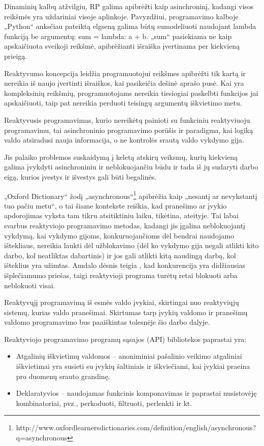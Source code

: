 Dinaminių kalbų atžvilgiu, RP galima apibrėžti kaip asinchroninį, kadangi visos reikšmės yra uždariniai visoje aplinkoje. Pavyzdžiui, programavimo kalboje „Python“ anksčiau pateiktą elgseną galima būtų sumodeliuoti naudojant lambda funkciją be argumentų: sum = lambda: a + b. „sum“ pasiekiama ne kaip apskaičiuota sveikoji reikšmė, apibrėžianti išraiška įvertinama per kiekvieną prieigą.

Reaktyvumo koncepcija leidžia programuotojui reikšmes apibrėžti tik kartą ir nereikia iš naujo įvertinti išraiškos, kai pasikeičia dešinė aprašo pusė. Kai yra kompleksinių reikšmių, programuotojams nereikia tiesiogiai paskelbti funkcijos jai apskaičiuoti, taip pat nereikia perduoti teisingų argumentų iškvietimo metu.

Reaktyvusis programavimas, kurio nereikėtų painioti su funkciniu reaktyviuoju programavimu, tai asinchroninio programavimo porūšis ir paradigma, kai logiką valdo atsiradusi nauja informacija, o ne kontrolės srautą valdo vykdymo gija.

Jis palaiko problemos suskaidymą į keletą atskirų veiksmų, kurių kiekvieną galima įvykdyti asinchroniniu ir neblokuojančiu būdu ir tada iš jų sudaryti darbo eigą, kurios įvestys ir išvestys gali būti begalinės.

„Oxford Dictionary“ žodį „asynchronous“\footnote{http://www.oxfordlearnersdictionaries.com/definition/english/asynchronous?q=asynchronous} apibrėžia kaip „nesantį ar nevykstantį tuo pačiu metu“, o tai šiame kontekste reiškia, kad pranešimo ar įvykio apdorojimas vyksta tam tikru atsitiktiniu laiku, tikėtina, ateityje. Tai labai svarbus reaktyviojo programavimo metodas, kadangi jis įgalina neblokuojantį vykdymą, kai vykdymo gijoms, konkuruojančioms dėl bendrai naudojamo ištekliaus, nereikia laukti dėl užblokavimo (dėl ko vykdymo gija negali atlikti kito darbo, kol neatliktas dabartinis) ir jos gali atlikti kitą naudingą darbą, kol išteklius yra užimtas. Amdalo dėsnis teigia \cite{Rodgers:1985:IMS:327070.327215}, kad konkurencija yra didžiausias išplečiamumo priešas, taigi reaktyvioji programa turėtų retai blokuoti arba neblokuoti visai.

Reaktyvųjį programavimą iš esmės valdo įvykiai, skirtingai nuo reaktyviųjų sistemų, kurias valdo pranešimai. Skirtumas tarp įvykių valdomo ir pranešimų valdomo programavimo bus paaiškintas tolesnėje šio darbo dalyje.

Reaktyviojo programavimo programų sąsajos (API) bibliotekos paprastai yra:

\begin{itemize}
  \item Atgalinių iškvietimų valdomos – anoniminiai pašalinio veikimo atgaliniai iškvietimai yra susieti su įvykių šaltiniais ir iškviečiami, kai įvykiai praeina pro duomenų srauto grandinę.
  \item Deklaratyvios – naudojamas funkcinis komponavimas ir paprastai nusistovėję kombinatoriai, pvz., perkoduoti, filtruoti, perlenkti ir kt.
\end{itemize}

